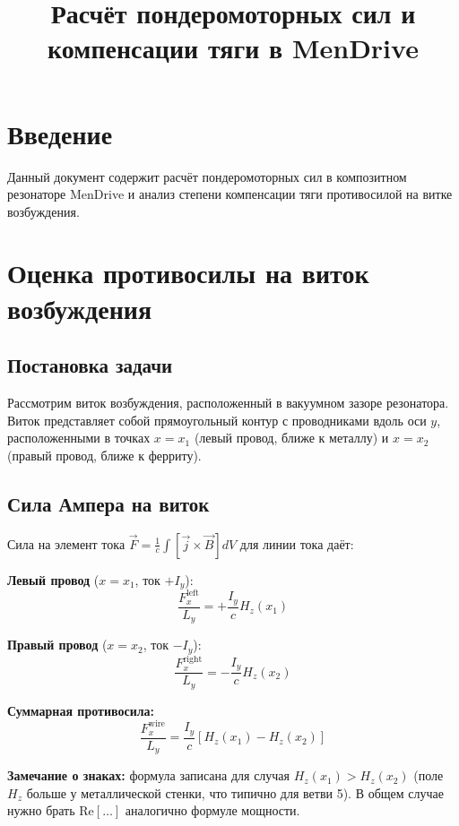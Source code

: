 \documentclass[a4paper,12pt]{article}
\title{Расчёт пондеромоторных сил и компенсации тяги в MenDrive}
\author{}
\date{}
\begin{document}
\maketitle

\section*{Введение}

Данный документ содержит расчёт пондеромоторных сил в композитном резонаторе MenDrive и анализ степени компенсации тяги противосилой на витке возбуждения.

\section{Оценка противосилы на виток возбуждения}

\subsection{Постановка задачи}

Рассмотрим виток возбуждения, расположенный в вакуумном зазоре резонатора. Виток представляет собой прямоугольный контур с проводниками вдоль оси $y$, расположенными в точках $x = x_1$ (левый провод, ближе к металлу) и $x = x_2$ (правый провод, ближе к ферриту).

\subsection{Сила Ампера на виток}

Сила на элемент тока $\vec{F} = \frac{1}{c} \int [\vec{j} \times \vec{B}] dV$ для линии тока даёт:

\textbf{Левый провод} ($x = x_1$, ток $+I_y$):
\begin{equation}
\frac{F_x^{\text{left}}}{L_y} = +\frac{I_y}{c} H_z(x_1)
\end{equation}

\textbf{Правый провод} ($x = x_2$, ток $-I_y$):
\begin{equation}
\frac{F_x^{\text{right}}}{L_y} = -\frac{I_y}{c} H_z(x_2)
\end{equation}

\textbf{Суммарная противосила:}
\begin{equation}
\boxed{
\frac{F_x^{\text{wire}}}{L_y} = \frac{I_y}{c} \left[ H_z(x_1) - H_z(x_2) \right]
}
\end{equation}

\textbf{Замечание о знаках:} формула записана для случая $H_z(x_1) > H_z(x_2)$ (поле $H_z$ больше у металлической стенки, что типично для ветви 5). В общем случае нужно брать $\mathrm{Re}[\ldots]$ аналогично формуле мощности.
\end{document}
